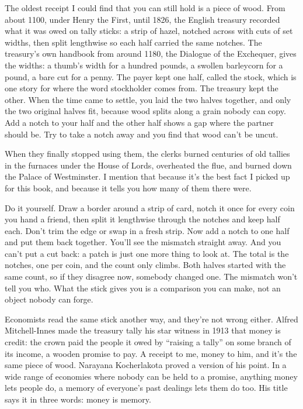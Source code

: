 \documentclass[11pt,twoside]{article}
\theoremstyle{thielethm}
\theoremstyle{thieledef}
\theoremstyle{thieledef}
\theoremstyle{thieledef}
\theoremstyle{thielethm}
\theoremstyle{thieleobs}
\theoremstyle{thielethm}
\begin{document}
The oldest receipt I could find that you can still hold is a piece of wood. From about 1100, under Henry the First, until 1826, the English treasury recorded what it was owed on tally sticks: a strip of hazel, notched across with cuts of set widths, then split lengthwise so each half carried the same notches. The treasury's own handbook from around 1180, the Dialogue of the Exchequer, gives the widths: a thumb's width for a hundred pounds, a swollen barleycorn for a pound, a bare cut for a penny. The payer kept one half, called the stock, which is one story for where the word stockholder comes from. The treasury kept the other. When the time came to settle, you laid the two halves together, and only the two original halves fit, because wood splits along a grain nobody can copy. Add a notch to your half and the other half shows a gap where the partner should be. Try to take a notch away and you find that wood can't be uncut.

When they finally stopped using them, the clerks burned centuries of old tallies in the furnaces under the House of Lords, overheated the flue, and burned down the Palace of Westminster. I mention that because it's the best fact I picked up for this book, and because it tells you how many of them there were.

Do it yourself. Draw a border around a strip of card, notch it once for every coin you hand a friend, then split it lengthwise through the notches and keep half each. Don't trim the edge or swap in a fresh strip. Now add a notch to one half and put them back together. You'll see the mismatch straight away. And you can't put a cut back: a patch is just one more thing to look at. The total is the notches, one per coin, and the count only climbs. Both halves started with the same count, so if they disagree now, somebody changed one. The mismatch won't tell you who. What the stick gives you is a comparison you can make, not an object nobody can forge.

Economists read the same stick another way, and they're not wrong either. Alfred Mitchell-Innes made the treasury tally his star witness in 1913 that money is credit: the crown paid the people it owed by ``raising a tally'' on some branch of its income, a wooden promise to pay. A receipt to me, money to him, and it's the same piece of wood. Narayana Kocherlakota proved a version of his point. In a wide range of economies where nobody can be held to a promise, anything money lets people do, a memory of everyone's past dealings lets them do too. His title says it in three words: money is memory.
\end{document}
